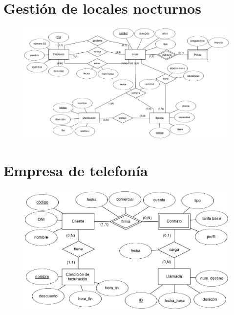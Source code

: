 \documentclass[a4paper]{article}
\begin{document}
\section{Gestión de locales nocturnos}
\begin{figure}[H]
    \centering
    \includegraphics[width=\textwidth]{figs/ejercicio-14}
\end{figure}

\section{Empresa de telefonía}
\begin{figure}[H]
    \centering
    \includegraphics[width=\textwidth]{figs/ejercicio-15}
\end{figure}
\end{document}

